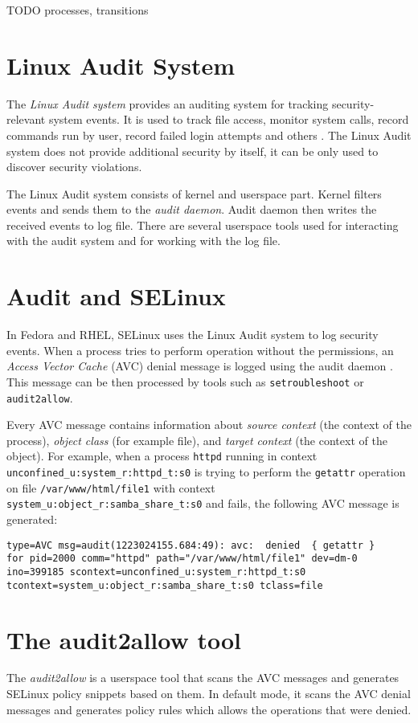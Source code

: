 TODO processes, transitions

\section{Linux Audit System}
The \emph{Linux Audit system} provides an auditing system for tracking
security-relevant system events. It is used to track file access, monitor system
calls, record commands run by user, record failed login attempts and others
\cite{secguide}. The Linux Audit system does not provide additional security by
itself, it can be only used to discover security violations.

The Linux Audit system consists of kernel and userspace part. Kernel filters
events and sends them to the \emph{audit daemon}. Audit daemon then writes the
received events to log file. There are several userspace tools used for
interacting with the audit system and for working with the log file.

\section{Audit and SELinux}
In Fedora and RHEL, SELinux uses the Linux Audit system to log security events.
When a process tries to perform operation without the permissions, an
\emph{Access Vector Cache} (AVC) denial message is logged using the audit daemon
\cite{selinuxguide}. This message can be then processed by tools such as
\texttt{setroubleshoot} or \texttt{audit2allow}.

Every AVC message contains information about \emph{source context} (the context
of the process), \emph{object class} (for example file), and \emph{target
context} (the context of the object). For example, when a process \texttt{httpd}
running in context \texttt{unconfined\_u:system\_r:httpd\_t:s0} is trying to
perform the \texttt{getattr} operation on file \texttt{/var/www/html/file1} with
context \texttt{system\_u:object\_r:samba\_share\_t:s0} and fails, the following
AVC message is generated:

\begin{lstlisting}
type=AVC msg=audit(1223024155.684:49): avc:  denied  { getattr }
for pid=2000 comm="httpd" path="/var/www/html/file1" dev=dm-0
ino=399185 scontext=unconfined_u:system_r:httpd_t:s0
tcontext=system_u:object_r:samba_share_t:s0 tclass=file
\end{lstlisting}

\section{The audit2allow tool}
The \emph{audit2allow} is a userspace tool that scans the AVC messages and
generates SELinux policy snippets based on them. In default mode, it scans the
AVC denial messages and generates policy rules which allows the operations that
were denied.

